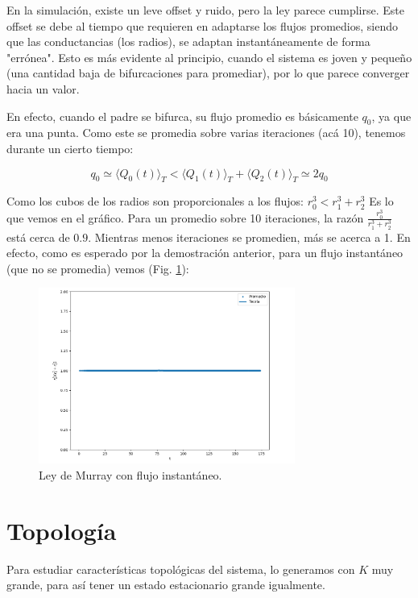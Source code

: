 \documentclass{article}
\begin{document}
En la simulación, existe un leve offset y ruido, pero la ley parece cumplirse. Este offset se debe al tiempo que requieren en adaptarse los flujos promedios, siendo que las conductancias (los radios), se adaptan instantáneamente de forma "errónea". Esto es más evidente al principio, cuando el sistema es joven y pequeño (una cantidad baja de bifurcaciones para promediar), por lo que parece converger hacia un valor.

En efecto, cuando el padre se bifurca, su flujo promedio es básicamente $q_0$, ya que era una punta. Como este se promedia sobre varias iteraciones (acá 10), tenemos durante un cierto tiempo:

$$ q_0 \simeq  \langle Q_{0}(t)\rangle_T < \langle Q_{1}(t)\rangle_T + \langle Q_{2}(t)\rangle_T \simeq 2q_0$$

Como los cubos de los radios son proporcionales a los flujos: $r_0^3 < r_1^3 + r_2^3$ Es lo que vemos en el gráfico. Para un promedio sobre 10 iteraciones, la razón $\frac{r_0^3}{r_1^3+r_2^3}$ está cerca de $0.9$. Mientras menos iteraciones se promedien, más se acerca a 1. En efecto, como es esperado por la demostración anterior, para un flujo instantáneo (que no se promedia) vemos (Fig. \ref{fig:murray_lindo}):

\begin{figure}[h!]
    \centering
    \includegraphics[width=0.75\textwidth]{graficos_inst/murray_lindo.png}
    \caption{Ley de Murray con flujo instantáneo.}
    \label{fig:murray_lindo}
\end{figure}
\newpage
\section{Topología}

Para estudiar características topológicas del sistema, lo generamos con $K$ muy grande, para así tener un estado estacionario grande igualmente.
\end{document}
